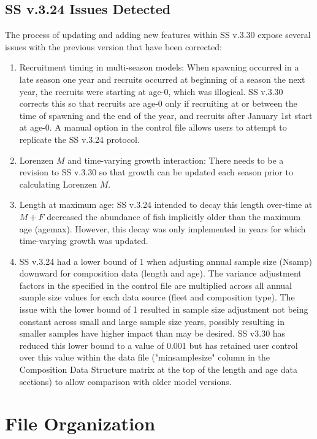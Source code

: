 \subsection{SS v.3.24 Issues Detected}
The process of updating and adding new features within SS v.3.30 expose several issues with the previous version that have been corrected:
\begin{enumerate}
	\item Recruitment timing in multi-season models: When spawning occurred in a late season one year and recruits occurred at beginning of a season the next year, the recruits were starting at age-0, which was illogical.  SS v.3.30 corrects this so that recruits are age-0 only if recruiting at or between the time of spawning and the end of the year, and recruits after January 1st start at age-0.  A manual option in the control file allows users to attempt to replicate the SS v.3.24 protocol.
	\item Lorenzen $M$ and time-varying growth interaction: There needs to be a revision to SS v.3.30 so that growth can be updated each season prior to calculating Lorenzen $M$.
	\item Length at maximum age: SS v.3.24 intended to decay this length over-time at $M + F$ decreased the abundance of fish implicitly older than the maximum age (agemax).  However, this decay was only implemented in years for which time-varying growth was updated.  
	\item SS v.3.24 had a lower bound of 1 when adjusting annual sample size (Nsamp) downward for composition data (length and age).  The variance adjustment factors in the specified in the control file are multiplied across all annual sample size values for each data source (fleet and composition type).  The issue with the lower bound of 1 resulted in sample size adjustment not being constant across small and large sample size years, possibly resulting in smaller samples have higher impact than may be desired.  SS v3.30 has reduced this lower bound to a value of 0.001 but has retained user control over this value within the data file ("minsamplesize" column in the Composition Data Structure matrix at the top of the length and age data sections) to allow comparison with older model versions. 
\end{enumerate}

		
\section{File Organization}\label{FileOrganization}		

